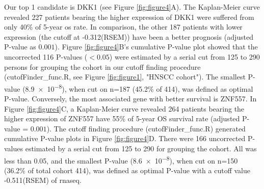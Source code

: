 \documentclass[cancers,article,submit,moreauthors,pdftex]{Definitions/mdpi}
\begin{document}
\clearpage


Our top 1 candidate is \acrfull{DKK1} (see Figure \ref{fig:figure4}A). The Kaplan-Meier curve revealed 227 patients bearing the higher expression of \acrshort{DKK1} were suffered from only 40\% of 5-year \acrshort{os} rate. In comparison, the other 187 patients with lower expression (the cutoff at -0.312(RSEM)) have been a better prognosis (adjusted P-value as $0.001$).
Figure \ref{fig:figure4}B's cumulative P-value plot showed that the uncorrected 116 P-values ($< 0.05$) were estimated by a serial cut from 125 to 290 persons for grouping the cohort in our cutoff finding procedure (cutofFinder\_func.R, see Figure \ref{fig:figure1}, "HNSCC cohort"). The smallest P-value (\num{8.9e-8}), when cut on n=187 (45.2\% of 414), was defined as optimal P-value.
Conversely, the most associated gene with better survival is \acrfull{ZNF557}. In Figure \ref{fig:figure4}C, a Kaplan-Meier curve revealed 264 patients bearing the higher expression of \acrshort{ZNF557} have 55\% of 5-year OS survival rate (adjusted P-value = $0.001$). The cutoff finding procedure (cutofFinder\_func.R) generated cumulative P-value plots in Figure \ref{fig:figure4}D. There were 166 uncorrected P-values estimated by a serial cut from 125 to 290 for grouping the cohort. All was less than 0.05, and the smallest P-value (\num{8.6e-8}), when cut on n=150 (36.2\% of total cohort 414), was defined as optimal P-value with a cutoff value -0.511(RSEM) of \acrshort{rnaseq}.
\end{document}
